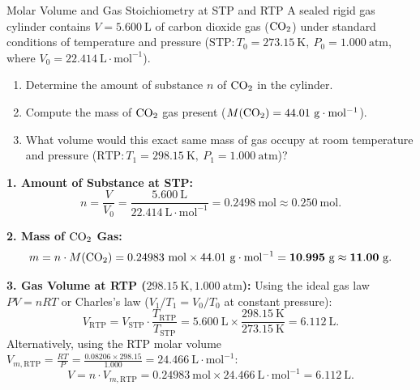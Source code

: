 \begin{exercise}{Molar Volume and Gas Stoichiometry at STP and RTP}
A sealed rigid gas cylinder contains $V = 5.600\ \mathrm{L}$ of carbon dioxide gas ($\ce{CO2}$) under standard conditions of temperature and pressure ($\mathrm{STP}: T_0 = 273.15\ \mathrm{K},\ P_0 = 1.000\ \mathrm{atm}$, where $V_0 = 22.414\ \mathrm{L\cdot mol^{-1}}$).
\begin{enumerate}[leftmargin=1.5em,itemsep=2pt]
  \item Determine the amount of substance $n$ of $\ce{CO2}$ in the cylinder.
  \item Compute the mass of $\ce{CO2}$ gas present ($M(\ce{CO2}) = 44.01\ \mathrm{g\cdot mol^{-1}}$).
  \item What volume would this exact same mass of gas occupy at room temperature and pressure ($\mathrm{RTP}: T_1 = 298.15\ \mathrm{K},\ P_1 = 1.000\ \mathrm{atm}$)?
\end{enumerate}
\end{exercise}

\begin{tabletworkspace}[5.0cm]
\end{tabletworkspace}

\begin{solution}
\textbf{1. Amount of Substance at STP:}
\[
n = \frac{V}{V_0} = \frac{5.600\ \mathrm{L}}{22.414\ \mathrm{L\cdot mol^{-1}}} = \mathbf{0.2498\ \mathrm{mol}} \approx \mathbf{0.250\ \mathrm{mol}}.
\]

\textbf{2. Mass of $\ce{CO2}$ Gas:}
\[
m = n \cdot M(\ce{CO2}) = 0.24983\ \mathrm{mol} \times 44.01\ \mathrm{g\cdot mol^{-1}} = \mathbf{10.995\ \mathrm{g}} \approx \mathbf{11.00\ \mathrm{g}}.
\]

\textbf{3. Gas Volume at RTP ($298.15\ \mathrm{K}, 1.000\ \mathrm{atm}$):}
Using the ideal gas law $P V = n R T$ or Charles's law ($V_1 / T_1 = V_0 / T_0$ at constant pressure):
\[
V_{\text{RTP}} = V_{\text{STP}} \cdot \frac{T_{\text{RTP}}}{T_{\text{STP}}} = 5.600\ \mathrm{L} \times \frac{298.15\ \mathrm{K}}{273.15\ \mathrm{K}} = \mathbf{6.112\ \mathrm{L}}.
\]
Alternatively, using the RTP molar volume $V_{m,\text{RTP}} = \frac{R T}{P} = \frac{0.08206 \times 298.15}{1.000} = 24.466\ \mathrm{L\cdot mol^{-1}}$:
\[
V = n \cdot V_{m,\text{RTP}} = 0.24983\ \mathrm{mol} \times 24.466\ \mathrm{L\cdot mol^{-1}} = \mathbf{6.112\ \mathrm{L}}.
\]
\end{solution}

